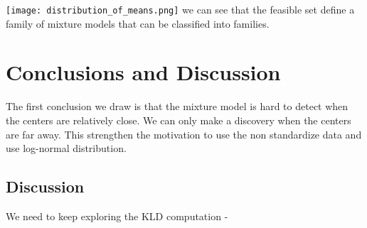 \documentclass[12pt]{article}
\begin{document}
\texttt{[image: distribution\_of\_means.png]}  
we can see that the feasible set define a family of mixture models that can be classified into families.
\section{Conclusions and Discussion}
The first conclusion we draw is that the mixture model is hard to detect when the centers are relatively close. We can only make a discovery when the centers are far away. This strengthen the motivation to use the non standardize data and use log-normal distribution.

\subsection*{Discussion}
We need to keep exploring the KLD computation - %
\end{document}
